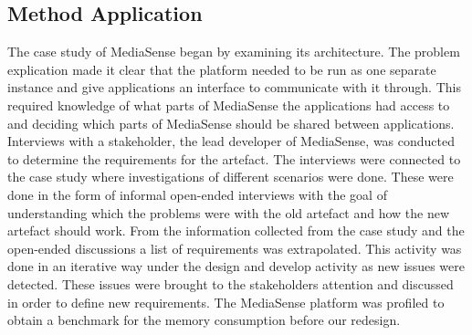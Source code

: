 \subsection{Method Application}
The case study of MediaSense began by examining its architecture. The problem explication made it clear that the platform needed to be run as one separate instance and give applications an interface to communicate with it through. This required knowledge of what parts of MediaSense the applications had access to and deciding which parts of MediaSense should be shared between applications. Interviews with a stakeholder, the lead developer of MediaSense, was conducted to determine the requirements for the artefact. The interviews were connected to the case study where investigations of different scenarios were done. These were done in the form of informal open-ended interviews with the goal of understanding which the problems were with the old artefact and how the new artefact should work.
From the information collected from the case study and the open-ended discussions a list of requirements was extrapolated. This activity was done in an iterative way under the design and develop activity as new issues were detected. These issues were brought to the stakeholders attention and discussed in order to define new requirements. The MediaSense platform was profiled to obtain a benchmark for the memory consumption before our redesign.
